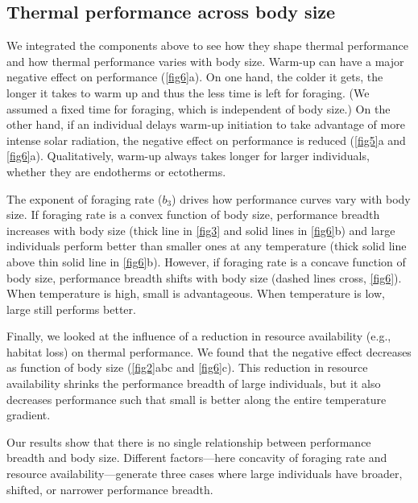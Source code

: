 \subsection*{Thermal performance across body size}
 We integrated the components above to see how they shape thermal performance and how thermal performance varies with body size.
Warm-up can have a major negative effect on performance (\cref{fig6}a).
On one hand, the colder it gets, the longer it takes to warm up and thus the less time is left for foraging.
(We assumed a fixed time for foraging, which is independent of body size.)
On the other hand, if an individual delays warm-up initiation to take advantage of more intense solar radiation, the negative effect on performance is reduced (\cref{fig5}a and \cref{fig6}a). %
Qualitatively, warm-up always takes longer for larger individuals, whether they are endotherms or ectotherms.

The exponent of foraging rate ($b_3$) drives how performance curves vary with body size.
If foraging rate is a convex function of body size, performance breadth increases with body size (thick line in \cref{fig3} and solid lines in \cref{fig6}b) and large individuals perform better than smaller ones at any temperature (thick solid line above thin solid line in \cref{fig6}b).
However, if foraging rate is a concave function of body size, performance breadth shifts with body size (dashed lines cross, \cref{fig6}).
When temperature is high, small is advantageous.
When temperature is low, large still performs better.

Finally, we looked at the influence of a reduction in resource availability (e.g., habitat loss) on thermal performance.
We found that the negative effect decreases as function of body size (\cref{fig2}abc and \cref{fig6}c).
This reduction in resource availability shrinks the performance breadth of large individuals, but it also decreases performance such that small is better along the entire temperature gradient.

Our results show that there is no single relationship between performance breadth and body size.
Different factors---here concavity of foraging  rate and resource availability---generate three cases where large individuals have broader, shifted, or narrower performance breadth.
